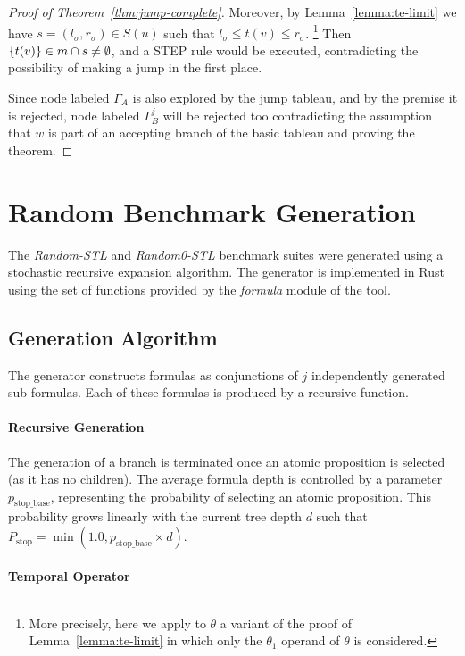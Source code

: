 \documentclass{easychair}
\begin{document}
\begin{proof}[Proof of Theorem~\ref{thm:jump-complete}]
    Moreover, by Lemma~\ref{lemma:te-limit} we have $s = (l_\sigma, r_\sigma) \in S(u)$ such that $l_\sigma \leq t(v) \leq r_\sigma$.%
    \footnote{More precisely, here we apply to $\theta$ a variant of the proof of Lemma~\ref{lemma:te-limit} in which only the $\theta_1$ operand of $\theta$ is considered.}
    Then $\{ t(v) \} \in m \cap s \neq \emptyset$, and a \textsf{STEP} rule would be executed, contradicting the possibility of making a jump in the first place.

    Since node labeled $\Gamma_A$ is also explored by the jump tableau, and by the premise it is rejected, node labeled $\Gamma_B^j$ will be rejected too contradicting the assumption that $w$ is part of an accepting branch of the basic tableau and proving the theorem.
\end{proof}

\section{Random Benchmark Generation}
\label{app:stl-bench}

The \emph{Random-STL} and \emph{Random0-STL} benchmark suites were generated using a stochastic recursive expansion algorithm. The generator is implemented in Rust using the set of functions provided by the \emph{formula} module of the \stlsat{} tool.

\subsection{Generation Algorithm}

The generator constructs formulas as conjunctions of $j$ independently generated sub-formulas. Each of these formulas is produced by a recursive function.

\paragraph{Recursive Generation}

The generation of a branch is terminated once an atomic proposition is selected (as it has no children). 
%
The average formula depth is controlled by a parameter $p_{\text{stop\_base}}$, representing the probability of selecting an atomic proposition. 
%
This probability grows linearly with the current tree depth $d$ such that $P_\text{stop} = \min(1.0, p_{\text{stop\_base}} \times d)$.

\paragraph{Temporal Operator}
\end{document}
